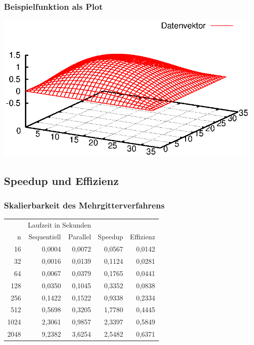 \documentclass{beamer}
\begin{document}
\begin{frame}\frametitle{Beispielfunktion als Plot}\includegraphics[width=\textwidth]{plots/009}\end{frame}

\subsection{Speedup und Effizienz}
\begin{frame}
    \frametitle{Skalierbarkeit des Mehrgitterverfahrens}
    \begin{center}
    \begin{tabular}{|r|r|r|r|r|} \hline
    & \multicolumn{2}{c|}{Laufzeit in Sekunden} & & \\
    n    & Sequentiell & Parallel & Speedup & Effizienz \\ \hline \hline
    16   & 0,0004      & 0,0072   & 0,0567  & 0,0142    \\
    32   & 0,0016      & 0,0139   & 0,1124  & 0,0281    \\
    64   & 0,0067      & 0,0379   & 0,1765  & 0,0441    \\
    128  & 0,0350      & 0,1045   & 0,3352  & 0,0838    \\
    256  & 0,1422      & 0,1522   & 0,9338  & 0,2334    \\
    512  & 0,5698      & 0,3205   & 1,7780  & 0,4445    \\
    1024 & 2,3061      & 0,9857   & 2,3397  & 0,5849    \\
    2048 & 9,2382      & 3,6254   & 2,5482  & 0,6371    \\ \hline
    \end{tabular}
    \end{center}
\end{frame}
\end{document}
